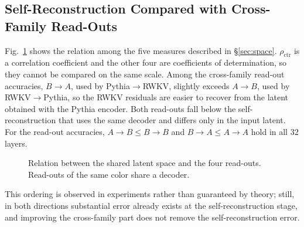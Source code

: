 \documentclass[conference]{IEEEtran}
\newcommand{\figref}[1]{Fig.~\ref{#1}}
\newcommand{\Rsq}{R^2}
\newcommand{\RtoP}{RWKV$\to$\allowbreak Pythia}
\newcommand{\PtoR}{Pythia$\to$\allowbreak RWKV}
\begin{document}
\subsection{Self-Reconstruction Compared with Cross-Family Read-Outs}\label{sec:ladder}
\figref{fig:ladder} shows the relation among the five measures described in \S\ref{sec:space}.
$\rho_{\mathrm{ctr}}$ is a correlation coefficient and the other four are coefficients of determination, so they cannot be compared on
the same scale. Among the cross-family read-out accuracies, $B\!\to\!A$, used by \PtoR{}, slightly exceeds $A\!\to\!B$, used by
\RtoP{}, so the RWKV residuals are easier to recover from the latent obtained with the Pythia encoder. Both read-outs fall below the
self-reconstruction that uses the same decoder and differs only in the input latent.
For the read-out accuracies, $A\!\to\!B\le B\!\to\!B$ and $B\!\to\!A\le A\!\to\!A$ hold in all $32$ layers.
\begin{figure}[!t]\centering
{}
\caption{Relation between the shared latent space and the four read-outs. Read-outs of the same color share a decoder.}
\label{fig:ladder}
\end{figure}
This ordering is observed in experiments rather than guaranteed by theory; still, in both directions substantial error already
exists at
the self-reconstruction stage, and improving the cross-family part does not remove the self-reconstruction error.
\end{document}

